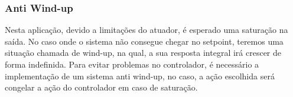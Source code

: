 \subsubsection{Anti Wind-up}

Nesta aplicação, devido a limitações do atuador, é esperado uma saturação na saída. No caso onde o sistema não consegue chegar no setpoint, teremos uma situação chamada de wind-up, na qual, a sua resposta integral irá crescer de forma indefinida. Para evitar problemas no controlador, é necessário a implementação de um sistema anti wind-up, no caso, a ação escolhida será congelar a ação do controlador em caso de saturação.  

